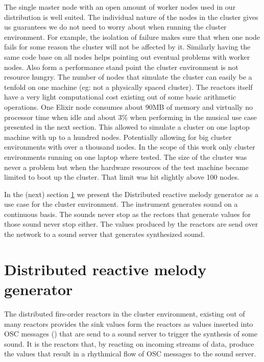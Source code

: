\documentclass[a4paper]{book}
\begin{document}
The single master node with an open amount of worker nodes used in our distribution is well suited. The individual nature of the nodes in the cluster gives us guarantees we do not need to worry about when running the cluster environment.
For example, the isolation of failure makes sure that when one node fails for some reason the cluster will not be affected by it. Similarly having the same code base on all nodes helps pointing out eventual problems with worker nodes.
Also form a performance stand point the cluster environment is not resource hungry. The number of nodes that simulate the cluster can easily be a tenfold on one machine (eg: not a physically spaced cluster). The reactors itself have a very light computational cost existing out of some basic arithmetic operations. One Elixir node consumes about 90MB of memory and virtually no processor time when idle and about 3\% when performing in the musical use case presented in the next section. This allowed to simulate a cluster on one laptop machine with up to a hundred nodes. Potentially allowing for big cluster environments with over a thousand nodes. In the scope of this work only cluster environments running on one laptop where tested. The size of the cluster was never a problem but when the hardware resources of the test machine became limited to boot up the cluster. That limit was hit slightly above 100 nodes.

In the (next) section \ref{sec:drmg} we present the Distributed reactive melody generator as a use case for the cluster environment. The instrument generates sound on a continuous basis. The sounds never stop as the rectors that generate values for those sound never stop either. The values produced by the reactors are send over the network to a sound server that generates synthesized sound.   

\section{Distributed reactive melody generator} \label{sec:drmg}
The distributed firs-order reactors in the cluster environment, existing out of many reactors provides the sink values form the reactors as values inserted into OSC messages (\cite{schmeder2010best}) that are send to a sound server to trigger the synthesis of some sound. It is the reactors that, by reacting on incoming streams of data, produce the values that result in a rhythmical flow of OSC messages to the sound server. 
\end{document}
